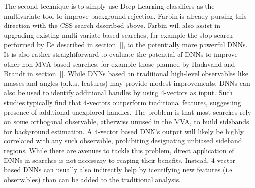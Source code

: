 The second technique is to simply use Deep Learning classifiers as the
multivariate tool to improve background rejection. Farbin is already
pursing this direction with the CSS search described above.  Farbin
will also assist in upgrading existing multi-variate based searches,
for example the stop search performed by De described in
section~\ref{}, to the potentially more powerful DNNs. It is also
rather straightforward to evaluate the potential of DNNs to improve
other non-MVA based searches, for example those planned by Hadavand
and Brandt in section~\ref{}. While DNNs based on traditional
high-level observables like masses and angles (a.k.a. features) may
provide modest improvements, DNNs can also be used to identify
additional handles by using 4-vectors as input. Such studies typically
find that 4-vectors outperform traditional features, suggesting
presence of additional unexplored handles. The problem is that most
searches rely on some orthogonal observable, otherwise unused in the
MVA, to build sidebands for background estimation. A 4-vector based
DNN's output will likely be highly correlated with any such
observable, prohibiting designating unbiased sideband regions. While
there are avenues to tackle this problem, direct application of DNNs
in searches is not necessary to reaping their benefits. Instead,
4-vector based DNNs can usually also indirectly help by identifying
new features (i.e. observables) than can be added to the traditional
analysis.



